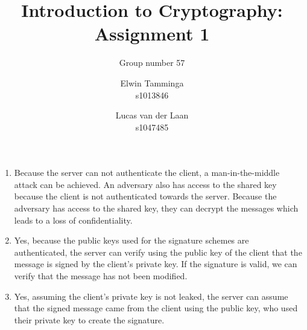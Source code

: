 \documentclass[12pt,a4paper,final,onecolumn,oneside]{article}
\title{Introduction to Cryptography: Assignment 1}
\subtitle{Group number 57}
\author{Elwin Tamminga \\ s1013846 \\ 
\and Lucas van der Laan \\ s1047485}
\date{}
\begin{document}
\fontsize{12pt}{13pt}\selectfont

\maketitle


\section{}

\begin{enumerate}[label=(\alph*)]
    \item Because the server can not authenticate the client, a man-in-the-middle attack can be achieved. An adversary also has access to the shared key because the client is not authenticated towards the server. Because the adversary has access to the shared key, they can decrypt the messages which leads to a loss of confidentiality.
    \item Yes, because the public keys used for the signature schemes are authenticated, the server can verify using the public key of the client that the message is signed by the client's private key. If the signature is valid, we can verify that the message has not been modified.
    \item Yes, assuming the client's private key is not leaked, the server can assume that the signed message came from the client using the public key, who used their private key to create the signature.
\end{enumerate}
\end{document}
